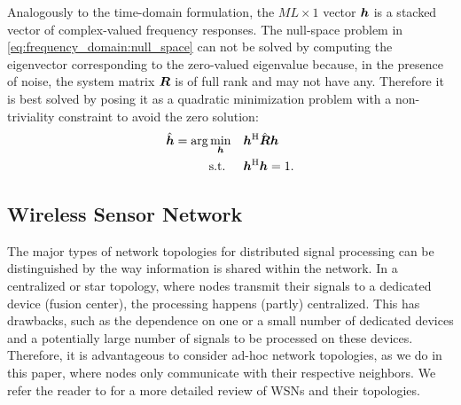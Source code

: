 \documentclass{article}
\begin{document}
Analogously to the time-domain formulation, the \(ML \times 1\) vector \({\bm{h}}\) is a stacked vector of complex-valued frequency responses.
The null-space problem in \eqref{eq:frequency_domain:null_space} can not be solved by computing the eigenvector corresponding to the zero-valued eigenvalue because, in the presence of noise, the system matrix \({\bm{{R}}}\) is of full rank and may not have any.
Therefore it is best solved by posing it as a quadratic minimization problem \cite{guanghanxuLeastsquaresApproachBlind1995,huangAdaptiveMultichannelLeast2002} with a non-triviality constraint to avoid the zero solution:
\begin{align}
    \hat{{\bm{h}}} = \arg \min_{{\bm{h}}} \quad &{\bm{h}}^{\mathrm{H}} \hat{{\bm{{R}}}} {\bm{h}} \label{eq:frequency_domain:min_prob}\\
    \text{s.t. } \quad &{\bm{h}}^{\mathrm{H}} {\bm{h}} = 1.
\end{align}

\subsection{Wireless Sensor Network}
\label{ssec:sensor_network}

The major types of network topologies for distributed signal processing can be distinguished by the way information is shared within the network.
In a centralized or star topology, where nodes transmit their signals to a dedicated device (fusion center), the processing happens (partly) centralized.
This has drawbacks, such as the dependence on one or a small number of dedicated devices and a potentially large number of signals to be processed on these devices.
Therefore, it is advantageous to consider ad-hoc network topologies, as we do in this paper, where nodes only communicate with their respective neighbors.
We refer the reader to \cite{bertrandApplicationsTrendsWireless2011b} for a more detailed review of WSNs and their topologies.
\end{document}
